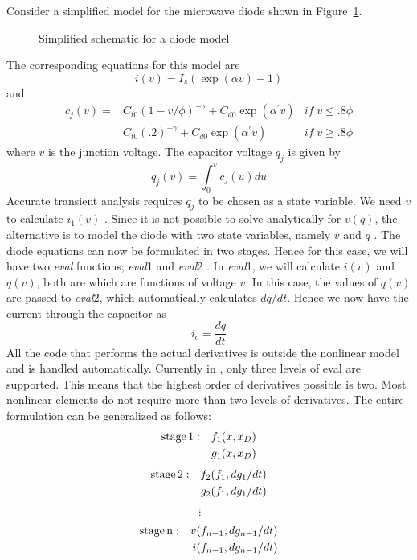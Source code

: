 Consider a simplified model for the microwave diode shown in Figure~\ref{diode_schematic_eval}.
\begin{figure}[h]
\centerline{}
\caption{\label{diode_schematic_eval}Simplified schematic for a diode model}
\end{figure}
The corresponding equations for this model are
\begin{equation}
i(v) = I_s (\exp( \alpha v ) - 1 )
\end{equation}
and
\begin{eqnarray}
c_j(v) = & C_{t0}(1 - {v / \phi})^{-\gamma} + C_{d0} \exp{(\alpha^{'}v)} & if\; v \leq .8\phi\\
         & C_{t0}(.2) ^{-\gamma} + C_{d0} \exp{(\alpha^{'}v)} & if\; v \geq .8\phi
\end{eqnarray}
where $v$ is the junction voltage. The capacitor voltage $q_j$ is given by
\begin{equation}
q_j ( v ) = \int_0^v c_j ( u ) du
\end{equation}
Accurate transient analysis requires $q_j$ to be chosen as a state variable.
We need $v$ to calculate $i_1( v )$ . Since it is
not possible to solve analytically
for $v ( q )$, the alternative is to model the diode with two state
variables, namely $v$ and $q$ . The diode equations
can now be formulated in two stages. Hence for this case, we
will have two \emph{eval} functions; \emph{eval}1 and \emph{eval}2 .
In \emph{eval}1, we will calculate $i(v)$ and
$q(v)$, both are which are functions of voltage $v$. In this case, the
values of $q(v)$ are passed to \emph{eval}2, which automatically calculates $d q /
d t$. Hence we now have the current through the capacitor as
\begin{equation}
i_c = \frac{d q}{d t}
\end{equation}
All the code that performs the actual derivatives is outside the nonlinear
model and is handled automatically. Currently in \FDA, only three levels of
eval are supported. This means that the highest order of derivatives possible
is two. Most nonlinear elements do not require more than two levels of
derivatives. The entire formulation can be generalized as follows:
\begin{eqnarray}
  \rm{stage} \, 1 & : & f_1 ( x, x_D ) \nonumber \\
  &  & g_1 ( x, x_D )
\end{eqnarray}
\begin{eqnarray}
  \rm{stage} \, 2 & : & f_2 ( f_1, d g_1 / d t ) \nonumber \\
  &  & g_2 ( f_1, d g_1 / d t )
\end{eqnarray}
\begin{eqnarray}
  \vdots &  & \nonumber
\end{eqnarray}
\begin{eqnarray}
  \rm{stage} \, n & : & v_{} ( f_{n - 1}, d g_{n - 1} / d t ) \nonumber \\
  &  & i ( f_{n - 1}, d g_{n - 1} / d t )
\end{eqnarray}

